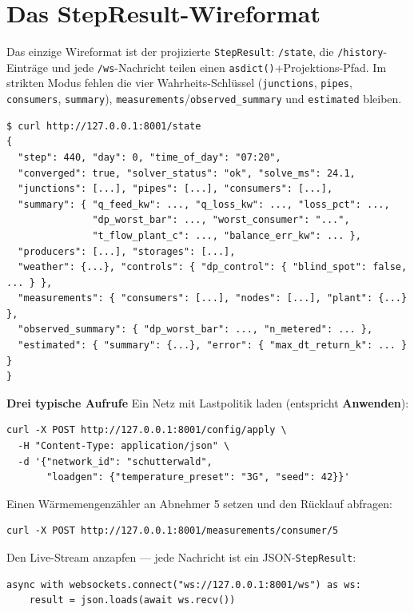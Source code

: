 \documentclass[11pt,a4paper,parskip=half]{scrreprt}
\newcommand{\ui}[1]{\textsf{\bfseries #1}}
\newcommand{\api}[1]{\texttt{#1}}
\newenvironment{beispiel}[1][Beispiel]
  {\par\medskip{\color{bsp}\hrule height 0.8pt}\nopagebreak\smallskip
   \noindent\textbf{\textsf{\textcolor{bsp}{#1}}}\quad\ignorespaces}
  {\par\nopagebreak\smallskip{\color{bsp}\hrule height 0.8pt}\par\medskip}
\begin{document}
\section{Das StepResult-Wireformat}

Das einzige Wireformat ist der projizierte \texttt{StepResult}: \api{/state},
die \api{/history}-Einträge und jede \api{/ws}-Nachricht teilen einen
\texttt{asdict()}+Projektions-Pfad. Im strikten Modus fehlen die vier
Wahrheits-Schlüssel (\texttt{junctions}, \texttt{pipes}, \texttt{consumers},
\texttt{summary}), \texttt{measurements}/\texttt{observed\_summary} und
\texttt{estimated} bleiben.

\begin{lstlisting}
$ curl http://127.0.0.1:8001/state
{
  "step": 440, "day": 0, "time_of_day": "07:20",
  "converged": true, "solver_status": "ok", "solve_ms": 24.1,
  "junctions": [...], "pipes": [...], "consumers": [...],
  "summary": { "q_feed_kw": ..., "q_loss_kw": ..., "loss_pct": ...,
               "dp_worst_bar": ..., "worst_consumer": "...",
               "t_flow_plant_c": ..., "balance_err_kw": ... },
  "producers": [...], "storages": [...],
  "weather": {...}, "controls": { "dp_control": { "blind_spot": false, ... } },
  "measurements": { "consumers": [...], "nodes": [...], "plant": {...} },
  "observed_summary": { "dp_worst_bar": ..., "n_metered": ... },
  "estimated": { "summary": {...}, "error": { "max_dt_return_k": ... } }
}
\end{lstlisting}

\begin{beispiel}[Drei typische Aufrufe]
Ein Netz mit Lastpolitik laden (entspricht \ui{Anwenden}):
\begin{lstlisting}
curl -X POST http://127.0.0.1:8001/config/apply \
  -H "Content-Type: application/json" \
  -d '{"network_id": "schutterwald",
       "loadgen": {"temperature_preset": "3G", "seed": 42}}'
\end{lstlisting}
Einen Wärmemengenzähler an Abnehmer 5 setzen und den Rücklauf abfragen:
\begin{lstlisting}
curl -X POST http://127.0.0.1:8001/measurements/consumer/5
\end{lstlisting}
Den Live-Stream anzapfen --- jede Nachricht ist ein JSON-\texttt{StepResult}:
\begin{lstlisting}
async with websockets.connect("ws://127.0.0.1:8001/ws") as ws:
    result = json.loads(await ws.recv())
\end{lstlisting}
\end{beispiel}
\end{document}
